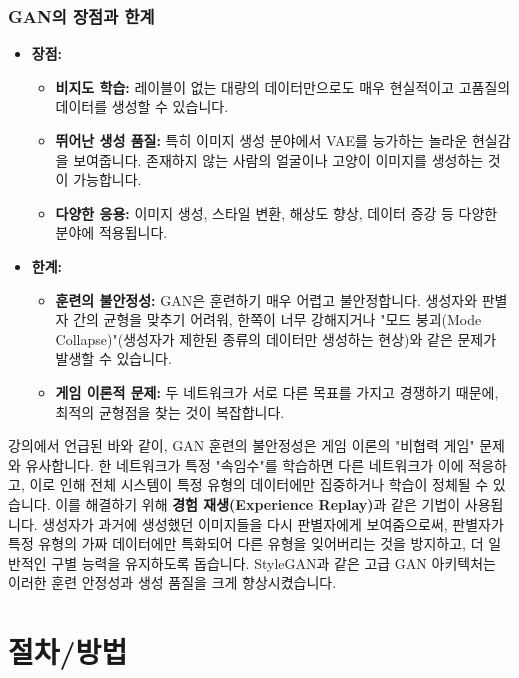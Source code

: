 \documentclass[11pt,a4paper]{article}
\theoremstyle{definition}
\begin{document}
\subsubsection{GAN의 장점과 한계}
\begin{itemize}
    \item \textbf{장점:}
    \begin{itemize}
        \item \textbf{비지도 학습:} 레이블이 없는 대량의 데이터만으로도 매우 현실적이고 고품질의 데이터를 생성할 수 있습니다.
        \item \textbf{뛰어난 생성 품질:} 특히 이미지 생성 분야에서 VAE를 능가하는 놀라운 현실감을 보여줍니다. 존재하지 않는 사람의 얼굴이나 고양이 이미지를 생성하는 것이 가능합니다.
        \item \textbf{다양한 응용:} 이미지 생성, 스타일 변환, 해상도 향상, 데이터 증강 등 다양한 분야에 적용됩니다.
    \end{itemize}
    \item \textbf{한계:}
    \begin{itemize}
        \item \textbf{훈련의 불안정성:} GAN은 훈련하기 매우 어렵고 불안정합니다. 생성자와 판별자 간의 균형을 맞추기 어려워, 한쪽이 너무 강해지거나 "모드 붕괴(Mode Collapse)"(생성자가 제한된 종류의 데이터만 생성하는 현상)와 같은 문제가 발생할 수 있습니다.
        \item \textbf{게임 이론적 문제:} 두 네트워크가 서로 다른 목표를 가지고 경쟁하기 때문에, 최적의 균형점을 찾는 것이 복잡합니다.
    \end{itemize}
\end{itemize}

\begin{tcolorbox}[warningbox, title=GAN 훈련의 불안정성 해결 노력]
강의에서 언급된 바와 같이, GAN 훈련의 불안정성은 게임 이론의 "비협력 게임" 문제와 유사합니다. 한 네트워크가 특정 "속임수"를 학습하면 다른 네트워크가 이에 적응하고, 이로 인해 전체 시스템이 특정 유형의 데이터에만 집중하거나 학습이 정체될 수 있습니다.
이를 해결하기 위해 \textbf{경험 재생(Experience Replay)}과 같은 기법이 사용됩니다. 생성자가 과거에 생성했던 이미지들을 다시 판별자에게 보여줌으로써, 판별자가 특정 유형의 가짜 데이터에만 특화되어 다른 유형을 잊어버리는 것을 방지하고, 더 일반적인 구별 능력을 유지하도록 돕습니다. StyleGAN과 같은 고급 GAN 아키텍처는 이러한 훈련 안정성과 생성 품질을 크게 향상시켰습니다.
\end{tcolorbox}

\newpage
\section{절차/방법}
\end{document}

